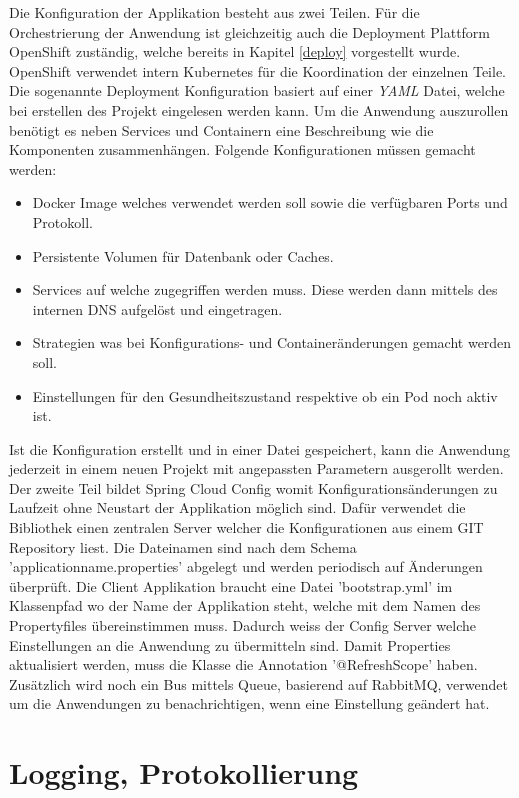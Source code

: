 Die Konfiguration der Applikation besteht aus zwei Teilen. Für die Orchestrierung der Anwendung ist gleichzeitig auch die Deployment Plattform OpenShift zuständig, welche bereits in Kapitel \ref{deploy} vorgestellt wurde. OpenShift verwendet intern Kubernetes für die Koordination der einzelnen Teile. Die sogenannte Deployment Konfiguration basiert auf einer \textit{\gls{YAML}} Datei, welche bei erstellen des Projekt eingelesen werden kann. 
Um die Anwendung  auszurollen benötigt es neben Services und Containern eine Beschreibung wie die Komponenten zusammenhängen. Folgende Konfigurationen müssen gemacht werden:
\begin{itemize}
	\item Docker Image welches verwendet werden soll sowie die verfügbaren Ports und Protokoll.
	\item Persistente Volumen für Datenbank oder Caches.
	\item Services auf welche zugegriffen werden muss. Diese werden dann mittels des internen DNS aufgelöst und eingetragen.
	\item Strategien was bei Konfigurations- und Containeränderungen gemacht werden soll.
	\item Einstellungen für den Gesundheitszustand respektive ob ein Pod noch aktiv ist.
\end{itemize}
Ist die Konfiguration erstellt und in einer Datei gespeichert, kann die Anwendung jederzeit in einem neuen Projekt mit angepassten Parametern ausgerollt werden.\newline
Der zweite Teil bildet Spring Cloud Config womit Konfigurationsänderungen zu Laufzeit ohne Neustart der Applikation möglich sind. Dafür verwendet die Bibliothek einen zentralen Server welcher die Konfigurationen aus einem GIT Repository liest. Die Dateinamen sind nach dem Schema 'applicationname.properties' abgelegt und werden periodisch auf Änderungen überprüft. Die Client Applikation braucht eine Datei 'bootstrap.yml' im Klassenpfad wo der Name der Applikation steht, welche mit dem Namen des Propertyfiles übereinstimmen muss. Dadurch weiss der Config Server welche Einstellungen an die Anwendung zu übermitteln sind. Damit Properties aktualisiert werden, muss die Klasse die Annotation '@RefreshScope' haben. Zusätzlich wird noch ein Bus mittels Queue, basierend auf RabbitMQ, verwendet um die Anwendungen zu benachrichtigen, wenn eine Einstellung geändert hat.

\section{Logging, Protokollierung}

